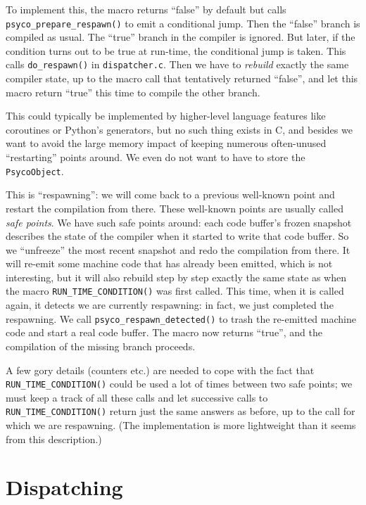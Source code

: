 \documentclass{article}
\def\code#1{\texttt{#1}}
\begin{document}
To implement this, the macro returns ``false'' by default but calls \code{psyco_prepare_respawn()} to emit a conditional jump. Then the ``false'' branch is compiled as usual. The ``true'' branch in the compiler is ignored. But later, if the condition turns out to be true at run-time, the conditional jump is taken. This calls \code{do_respawn()} in \code{dispatcher.c}. Then we have to \emph{rebuild} exactly the same compiler state, up to the macro call that tentatively returned ``false'', and let this macro return ``true'' this time to compile the other branch.

This could typically be implemented by higher-level language features like coroutines or Python's generators, but no such thing exists in C, and besides we want to avoid the large memory impact of keeping numerous often-unused ``restarting'' points around. We even do not want to have to store the \code{PsycoObject}.

This is ``respawning'': we will come back to a previous well-known point and restart the compilation from there. These well-known points are usually called \emph{safe points}. We have such safe points around: each code buffer's frozen snapshot describes the state of the compiler when it started to write that code buffer. So we ``unfreeze'' the most recent snapshot and redo the compilation from there. It will re-emit some machine code that has already been emitted, which is not interesting, but it will also rebuild step by step exactly the same state as when the macro \code{RUN_TIME_CONDITION()} was first called. This time, when it is called again, it detects we are currently respawning: in fact, we just completed the respawning. We call \code{psyco_respawn_detected()} to trash the re-emitted machine code and start a real code buffer. The macro now returns ``true'', and the compilation of the missing branch proceeds.

A few gory details (counters etc.) are needed to cope with the fact that \code{RUN_TIME_CONDITION()} could be used a lot of times between two safe points; we must keep a track of all these calls and let successive calls to \code{RUN_TIME_CONDITION()} return just the same answers as before, up to the call for which we are respawning. (The implementation is more lightweight than it seems from this description.)



\section{Dispatching}\label{secdispatch}
\end{document}
